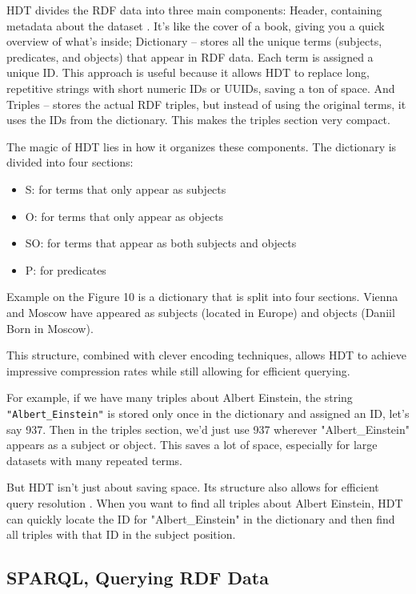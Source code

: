 HDT divides the RDF data into three main components: Header, containing metadata about the dataset \citep{fernandez2018hdtq}. It's like the cover of a book, giving you a quick overview of what's inside; Dictionary – stores all the unique terms (subjects, predicates, and objects) that appear in RDF data. Each term is assigned a unique ID. This approach is useful because it allows HDT to replace long, repetitive strings with short numeric IDs or UUIDs, saving a ton of space. And Triples – stores the actual RDF triples, but instead of using the original terms, it uses the IDs from the dictionary. This makes the triples section very compact.

The magic of HDT lies in how it organizes these components. The dictionary is divided into four sections:


\begin{itemize}
    \item S: for terms that only appear as subjects
    \item O: for terms that only appear as objects
    \item SO: for terms that appear as both subjects and objects
    \item P: for predicates
\end{itemize}

Example on the Figure 10 is a dictionary that is split into four sections. Vienna and Moscow have appeared as subjects (located in Europe) and objects (Daniil Born in Moscow).

This structure, combined with clever encoding techniques, allows HDT to achieve impressive compression rates while still allowing for efficient querying.

For example, if we have many triples about Albert Einstein, the string \verb|"Albert_Einstein"| is stored only once in the dictionary and assigned an ID, let's say 937. Then in the triples section, we'd just use 937 wherever "Albert\_Einstein" appears as a subject or object. This saves a lot of space, especially for large datasets with many repeated terms.

But HDT isn't just about saving space. Its structure also allows for efficient query resolution \citep{fernandez2018hdtq}. When you want to find all triples about Albert Einstein, HDT can quickly locate the ID for "Albert\_Einstein" in the dictionary and then find all triples with that ID in the subject position.

\subsection{SPARQL, Querying RDF Data}

